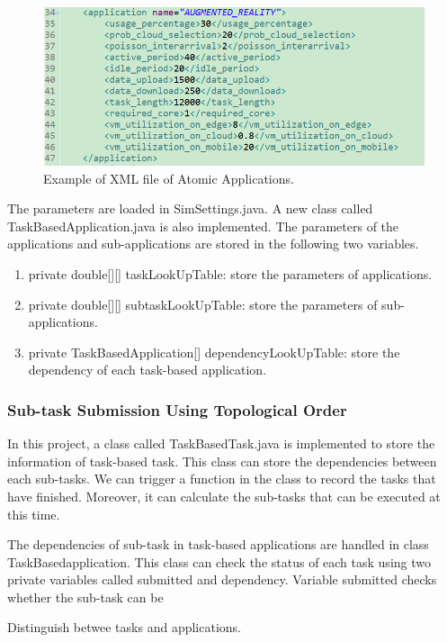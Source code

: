 \begin{figure}
	\centering
	\includegraphics[width=1\textwidth]{./figures/atomic-application-xml.png}
	\caption{\label{fig:frog}Example of XML file of Atomic Applications.}
\end{figure}

The parameters are loaded in SimSettings.java. A new class called TaskBasedApplication.java is also implemented. The parameters of the applications and sub-applications are stored in the following two variables.

\begin{enumerate}
	\item private double[][] taskLookUpTable: store the parameters of applications.
	\item private double[][] subtaskLookUpTable: store the parameters of sub-applications.
	\item private TaskBasedApplication[] dependencyLookUpTable: store the dependency of each task-based application.
\end{enumerate}


\subsubsection{Sub-task Submission Using Topological Order}
In this project, a class called TaskBasedTask.java is implemented to store the information of task-based task. This class can store the dependencies between each sub-tasks. We can trigger a function in the class to record the tasks that have finished. Moreover, it can calculate the sub-tasks that can be executed at this time.

The dependencies of sub-task in task-based applications are handled in class TaskBasedapplication. This class can check the status of each task using two private variables called submitted and dependency. Variable submitted checks whether the sub-task can be 

Distinguish betwee tasks and applications. 

